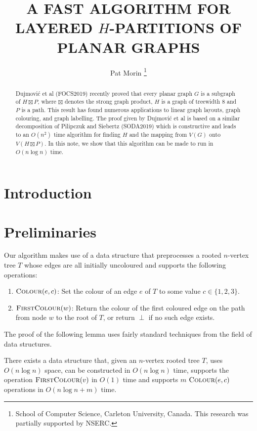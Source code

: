 \documentclass[kpfonts]{patmorin}
\title{\MakeUppercase{A Fast Algorithm for Layered $H$-Partitions of Planar Graphs}}
\author{
  Pat Morin%
    \thanks{School of Computer Science, Carleton University, Canada. This research was partially supported by NSERC.}
}
\begin{document}
\maketitle

\begin{abstract}
  Dujmović et al (FOCS2019) recently proved that every planar graph $G$ is a subgraph of $H\boxtimes P$, where $\boxtimes$ denotes the strong graph product, $H$ is a graph of treewidth 8 and $P$ is a path.  This result has found numerous applications to linear graph layouts, graph colouring, and graph labelling.  The proof given by Dujmović et al is based on a similar decomposition of Pilipczuk and Siebertz (SODA2019) which is constructive and leads to an $O(n^2)$ time algorithm for finding $H$ and the mapping from $V(G)$ onto $V(H\boxtimes P)$.  In this note, we show that this algorithm can be made to run in $O(n\log n)$ time.
\end{abstract}

\section{Introduction}

\section{Preliminaries}

Our algorithm makes use of a data structure that preprocesses a rooted $n$-vertex tree $T$ whose edges are all initially uncoloured and supports the following operations:
\begin{enumerate}
  \item $\textsc{Colour}(e,c)$: Set the colour of an edge $e$ of $T$ to some value $c\in\{1,2,3\}$.
  \item $\textsc{FirstColour}(w)$: Return the colour of the first coloured edge on the path from node $w$ to the root of $T$, or return $\perp$ if no such edge exists.
\end{enumerate}

The proof of the following lemma uses fairly standard techniques from the field of data structures.

\begin{lem}
  There exists a data structure that, given an $n$-vertex rooted tree $T$, uses $O(n\log n)$ space, can be constructed in $O(n\log n)$ time, supports the operation $\textsc{FirstColour}(v)$ in $O(1)$ time and supports $m$ $\textsc{Colour}(e,c)$ operations in $O(n\log n + m)$ time.
\end{lem}
\end{document}
